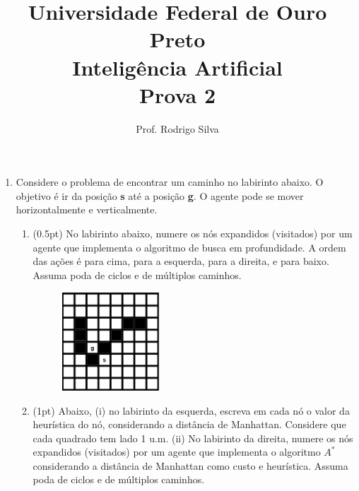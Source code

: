 \documentclass{article}
\title{\vspace{-2 cm}Universidade Federal de Ouro Preto \\ Inteligência Artificial \\ Prova 2}
\author{Prof. Rodrigo Silva}
\date{}
\begin{document}
\maketitle


\begin{enumerate}
    
    \item Considere o problema de encontrar um caminho no labirinto abaixo. O objetivo é ir da posição \textbf{s} até a posição \textbf{g}. O agente pode se mover horizontalmente e verticalmente. 
    
    \begin{enumerate}
        
        \item (0.5pt) No labirinto abaixo, numere os nós expandidos (visitados) por um agente que implementa o algoritmo de busca em profundidade. A ordem das ações é para cima, para a esquerda, para a direita, e para baixo. Assuma poda de ciclos e de múltiplos caminhos.
        \begin{figure}[!ht]
            \centering
            \includegraphics[width=0.37\textwidth]{lab_1.png}
        \end{figure}
        
        \item (1pt) Abaixo, (i) no labirinto da esquerda, escreva em cada nó o valor da heurística do nó, considerando a distância de Manhattan. Considere que cada quadrado tem lado 1 u.m. (ii) No labirinto da direita, numere os nós expandidos (visitados) por um agente que implementa o algoritmo $A^*$ considerando a distância de Manhattan como custo e heurística. Assuma poda de ciclos e de múltiplos caminhos.
        

\end{enumerate}
\end{enumerate}
\end{document}

